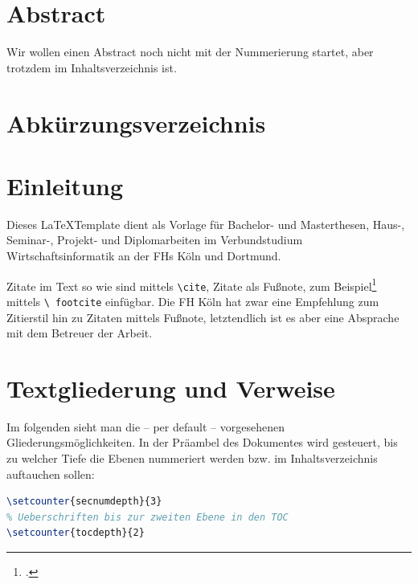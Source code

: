 \documentclass[12pt,oneside,a4paper,bibtotoc,liststotoc]{scrreprt}
\begin{document}
\tableofcontents

\onehalfspacing %

\chapter*{Abstract}

Wir wollen einen Abstract noch nicht mit der Nummerierung startet, aber trotzdem im Inhaltsverzeichnis ist.

\listoffigures

\listoftables

\lstlistoflistings

\chapter*{Abkürzungsverzeichnis}
\begin{acronym}[Thesis]

\end{acronym}


\chapter{Einleitung}

Dieses \LaTeX Template dient als Vorlage für Bachelor- und
Masterthesen, Haus-, Seminar-, Projekt- und Diplomarbeiten im
Verbundstudium Wirtschaftsinformatik an der \acp{FH} Köln und
Dortmund.

Zitate im Text so wie \cite[vgl.][S.~1]{Lamport} sind mittels
\texttt{\textbackslash cite}, Zitate als Fußnote, zum
Beispiel\footcite[vgl.][S.~1]{Lamport} mittels \texttt{\textbackslash
  footcite} einfügbar. Die \ac{FH} Köln hat zwar eine Empfehlung zum
Zitierstil hin zu Zitaten mittels Fußnote, letztendlich ist es aber
eine Absprache mit dem Betreuer der Arbeit.

\chapter{Textgliederung und Verweise}

Im folgenden sieht man die -- per default -- vorgesehenen
Gliederungsmöglichkeiten. In der Präambel des Dokumentes wird
gesteuert, bis zu welcher Tiefe die Ebenen nummeriert werden bzw. im
Inhaltsverzeichnis auftauchen sollen:

\begin{lstlisting}[language=TeX,caption=Steuerung der
  Nummerierungstiefe und Inhaltsverzeichnistiefe in der
  Prämbel,label=praeambel_tiefe]
% Ueberschriften bis zur dritten Ebene durchnummerieren
\setcounter{secnumdepth}{3}
% Ueberschriften bis zur zweiten Ebene in den TOC
\setcounter{tocdepth}{2}
\end{lstlisting}
\end{document}
